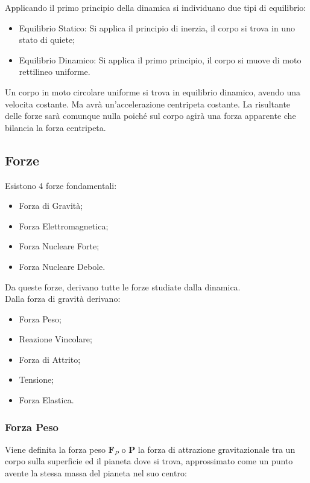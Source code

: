 \documentclass{article}
\newcommand{\vect}[1]{\boldsymbol{\mathbf{#1}}}
\numberwithin{equation}{subsection}
\begin{document}
Applicando 
il primo principio della dinamica si individuano due tipi di 
equilibrio:
\begin{itemize}
    \item Equilibrio Statico: Si applica il principio di inerzia, 
    il corpo si trova in uno stato di quiete;
    \item Equilibrio Dinamico: Si applica il primo principio, 
    il corpo si muove di moto rettilineo uniforme.
\end{itemize}

Un corpo in moto circolare uniforme si trova in equilibrio 
dinamico, avendo una velocita costante. Ma avrà un'accelerazione centripeta costante. La risultante delle forze sarà 
comunque nulla poiché sul corpo agirà una forza apparente che 
bilancia la forza centripeta.
 
\subsection{Forze}

Esistono 4 forze fondamentali:
\begin{itemize}
    \item Forza di Gravità;
    \item Forza Elettromagnetica;
    \item Forza Nucleare Forte;
    \item Forza Nucleare Debole.
\end{itemize}
Da queste forze, derivano tutte le forze studiate dalla 
dinamica.\\
Dalla forza di gravità derivano:

\begin{itemize}
    \item Forza Peso;
    \item Reazione Vincolare;
    \item Forza di Attrito;
    \item Tensione;
    \item Forza Elastica.
\end{itemize}

\subsubsection{Forza Peso}

Viene definita la forza peso $\vect{F}_P$ o $\vect{P}$ la forza di attrazione gravitazionale tra un
corpo sulla superficie ed il pianeta dove si trova, approssimato 
come un punto avente la stessa massa del pianeta nel suo centro:
\end{document}
